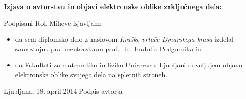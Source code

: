 \documentclass[a4paper, twoside, 12pt]{book}
\begin{document}
    \newpage \thispagestyle{empty}


    \nocite{*}
    \newpage
    {}
    

    \newpage \thispagestyle{empty}



    \vspace*{1cm}
    \begin{center} {\Large \textbf{\sc Izjava o avtorstvu in objavi elektronske oblike zaključnega dela: }} \end{center}

      \vspace{1cm} \noindent Podpisani Rok Mihevc izjavljam:
      \noindent 

      \begin{itemize}
        \item 
          da sem diplomsko delo z naslovom \emph{Kraške vrtače Dinarskega krasa} izdelal samostojno pod mentorstvom prof.\ dr.\ \mbox{Rudolfa} \mbox{Podgornika} in
        \item
          da Fakulteti za matematiko in fiziko Univerze v Ljubljani dovoljujem objavo elektronske 
          oblike svojega dela na spletnih straneh.
      \end{itemize}

      \vspace{1cm} \noindent Ljubljana, 18. april 2014 \hfill Podpis avtorja:


      
\end{document}
